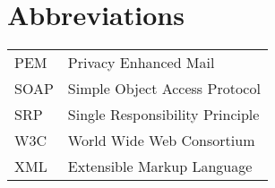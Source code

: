 
\chapter*{Abbreviations}

\begin{tabular}{p{20mm}p{120mm}}

  PEM & Privacy Enhanced Mail \\
  SOAP & Simple Object Access Protocol \\
  SRP & Single Responsibility Principle \\
  W3C & World Wide Web Consortium \\
  XML & Extensible Markup Language \\

\end{tabular}
